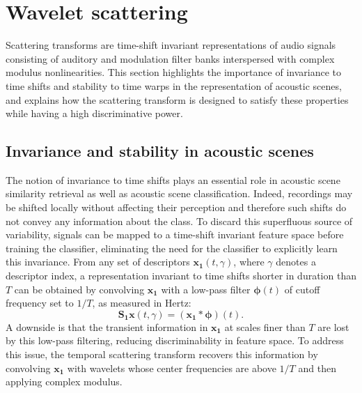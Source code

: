 \documentclass[journal]{IEEEtran}
\newcommand{\ja}[1]{\textcolor{magenta}{Joakim : #1}}
\begin{document}



\section{Wavelet scattering \label{sec:scattering}}

Scattering transforms are time-shift invariant representations of audio signals consisting of auditory and modulation filter banks interspersed with complex modulus nonlinearities.
This section highlights the importance of invariance to time shifts and stability to time warps in the representation of acoustic scenes, and explains how the scattering transform is designed to satisfy these properties while having a high discriminative power.

\subsection{Invariance and stability in acoustic scenes}
The notion of invariance to time shifts plays an essential role in acoustic scene similarity retrieval as well as acoustic scene classification.
Indeed, recordings may be shifted locally without affecting their perception and therefore such shifts do not convey any information about the class.
To discard this superfluous source of variability, signals can be mapped to a time-shift invariant feature space before training the classifier, eliminating the need for the classifier to explicitly learn this invariance.
From any set of descriptors $\boldsymbol{x_1}(t,\gamma)$, where $\gamma$ denotes a descriptor index, a representation invariant to time shifts shorter in duration than $T$ can be obtained by convolving $\boldsymbol{x_1}$ with a low-pass filter $\boldsymbol{\phi}(t)$ of cutoff frequency set to $1/T$, as measured in Hertz:
\begin{equation}
\mathbf{S_1}\boldsymbol{x}(t, \gamma) = (\boldsymbol{x_1} \ast \boldsymbol{\phi}) (t).
\end{equation}
A downside is that the transient information in $\boldsymbol{x_1}$ at scales finer than $T$ are lost by this low-pass filtering, reducing discriminability in feature space.
To address this issue, the temporal scattering transform recovers this information by convolving $\boldsymbol{x_1}$ with wavelets whose center frequencies are above $1/T$ and then applying complex modulus.
\end{document}
